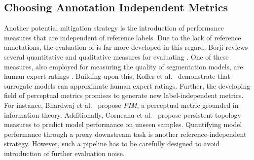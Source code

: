 \subsection{Choosing Annotation Independent Metrics}
Another potential mitigation strategy is the introduction of performance measures that are independent of reference labels.
Due to the lack of reference annotations, the evaluation of  is far more developed in this regard.
Borji reviews several quantitative and qualitative measures for evaluating  \citep{borji2019pros,BORJI2022103329}.
One of these measures, also employed for measuring the quality of segmentation models, are human expert ratings \citep{kofler2021we}.
Building upon this, Kofler et al.\ \citep{kofler2022deep} demonstrate that surrogate models can approximate human expert ratings.
Further, the developing field of perceptual metrics promises to generate new label-independent metrics.
For instance, Bhardwaj et al.\ \citep{NEURIPS2020_Bhardwaj} propose \emph{PIM}, a perceptual metric grounded in information theory.
Additionally, Corneanu et al.\ \citep{corneanu2020computing} propose persistent topology measures to predict model performance on unseen samples.
Quantifying model performance through a proxy downstream task is another reference-independent strategy.
However, such a pipeline has to be carefully designed to avoid introduction of further evaluation noise.
